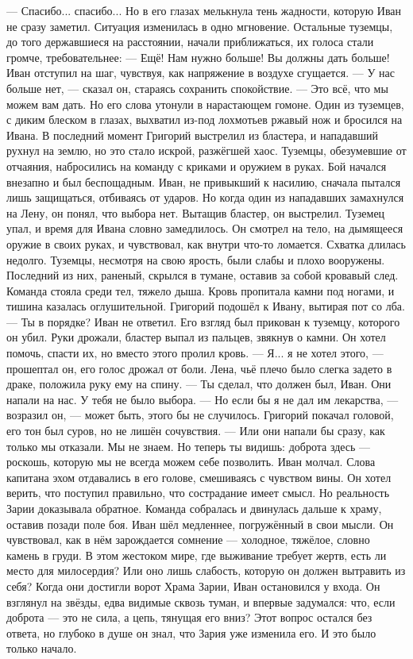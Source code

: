 \documentclass[12pt,a4paper]{book}
\begin{document}
— Спасибо... спасибо...
Но в его глазах мелькнула тень жадности, которую Иван не сразу заметил.
Ситуация изменилась в одно мгновение. Остальные туземцы, до того державшиеся на расстоянии, начали приближаться, их голоса стали громче, требовательнее:
— Ещё! Нам нужно больше! Вы должны дать больше!
Иван отступил на шаг, чувствуя, как напряжение в воздухе сгущается.
— У нас больше нет, — сказал он, стараясь сохранить спокойствие. — Это всё, что мы можем вам дать.
Но его слова утонули в нарастающем гомоне. Один из туземцев, с диким блеском в глазах, выхватил из-под лохмотьев ржавый нож и бросился на Ивана. В последний момент Григорий выстрелил из бластера, и нападавший рухнул на землю, но это стало искрой, разжёгшей хаос. Туземцы, обезумевшие от отчаяния, набросились на команду с криками и оружием в руках.
Бой начался внезапно и был беспощадным. Иван, не привыкший к насилию, сначала пытался лишь защищаться, отбиваясь от ударов. Но когда один из нападавших замахнулся на Лену, он понял, что выбора нет. Вытащив бластер, он выстрелил. Туземец упал, и время для Ивана словно замедлилось. Он смотрел на тело, на дымящееся оружие в своих руках, и чувствовал, как внутри что-то ломается.
Схватка длилась недолго. Туземцы, несмотря на свою ярость, были слабы и плохо вооружены. Последний из них, раненый, скрылся в тумане, оставив за собой кровавый след. Команда стояла среди тел, тяжело дыша. Кровь пропитала камни под ногами, и тишина казалась оглушительной.
Григорий подошёл к Ивану, вытирая пот со лба.
— Ты в порядке?
Иван не ответил. Его взгляд был прикован к туземцу, которого он убил. Руки дрожали, бластер выпал из пальцев, звякнув о камни. Он хотел помочь, спасти их, но вместо этого пролил кровь.
— Я... я не хотел этого, — прошептал он, его голос дрожал от боли.
Лена, чьё плечо было слегка задето в драке, положила руку ему на спину.
— Ты сделал, что должен был, Иван. Они напали на нас. У тебя не было выбора.
— Но если бы я не дал им лекарства, — возразил он, — может быть, этого бы не случилось.
Григорий покачал головой, его тон был суров, но не лишён сочувствия.
— Или они напали бы сразу, как только мы отказали. Мы не знаем. Но теперь ты видишь: доброта здесь — роскошь, которую мы не всегда можем себе позволить.
Иван молчал. Слова капитана эхом отдавались в его голове, смешиваясь с чувством вины. Он хотел верить, что поступил правильно, что сострадание имеет смысл. Но реальность Зарии доказывала обратное.
Команда собралась и двинулась дальше к храму, оставив позади поле боя. Иван шёл медленнее, погружённый в свои мысли. Он чувствовал, как в нём зарождается сомнение — холодное, тяжёлое, словно камень в груди. В этом жестоком мире, где выживание требует жертв, есть ли место для милосердия? Или оно лишь слабость, которую он должен вытравить из себя?
Когда они достигли ворот Храма Зарии, Иван остановился у входа. Он взглянул на звёзды, едва видимые сквозь туман, и впервые задумался: что, если доброта — это не сила, а цепь, тянущая его вниз? Этот вопрос остался без ответа, но глубоко в душе он знал, что Зария уже изменила его. И это было только начало.
\end{document}
